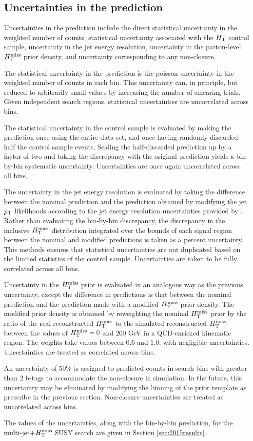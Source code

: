 \subsection{Uncertainties in the prediction}
Uncertainties in the prediction include the direct statistical uncertainty in the weighted number of counts, statistical uncertainty associated with the $H_{\rm T}$ control sample, uncertainty in the jet energy resolution, uncertainty in the parton-level $H_{\text{T}}^{\rm miss}$ prior density, and uncertainty corresponding to any non-closure. 

The statistical uncertainty in the prediction is the poisson uncertainty in the weighted number of counts in each bin. This uncertainty can, in principle, but reduced to arbitrarily small values by increasing the number of smearing trials. Given independent search regions, statistical uncertainties are uncorrelated across bins. 

The statistical uncertainty in the control sample is evaluated by making the prediction once using the entire data set, and once having randomly discarded half the control sample events. Scaling the half-discarded prediction up by a factor of two and taking the discrepancy with the original prediction yields a bin-by-bin systematic uncertainty. Uncertainties are once again uncorrelated across all bins.

The uncertainty in the jet energy resolution is evaluated by taking the difference between the nominal prediction and the prediction obtained by modifying the jet $p_{\text{T}}$ likelihoods according to the jet energy resolution uncertainties provided by  \cite{jetmet2}. Rather than evaluating the bin-by-bin discrepancy, the discrepancy in the inclusive $H_{\text{T}}^{\rm miss}$ distribution integrated over the bounds of each signal region between the nominal and modified predictions is taken as a percent uncertainty. This methods ensures that statistical uncertainties are not duplicated based on the limited statistics of the control sample. Uncertainties are taken to be fully correlated across all bins.

Uncertainty in the $H_{\text{T}}^{\rm miss}$ prior is evaluated in an analogous way as the previous uncertainty, except the difference in predictions is that between the nominal prediction and the prediction made with a modified $H_{\text{T}}^{\rm miss}$ prior density. The modified prior density is obtained by reweighting the nominal $H_{\text{T}}^{\rm miss}$ prior by the ratio of the real reconstructed $H_{\text{T}}^{\rm miss}$ to the simulated reconstructed $H_{\text{T}}^{\rm miss}$ between the values of $H_{\text{T}}^{\rm miss}=0$ and 200 GeV in a QCD-enriched kinematic region. The weights take values between 0.6 and 1.0, with negligible uncertainties. Uncertainties are treated as correlated across bins.

An uncertainty of 50\% is assigned to predicted counts in search bins with greater than 2 b-tags to accommodate the non-closure in simulation. In the future, this uncertainty may be eliminated by modifying the binning of the prior template as prescribe in the previous section. Non-closure uncertainties are treated as uncorrelated across bins. 

The values of the uncertainties, along with the bin-by-bin prediction, for the multi-jet$+$$H_{\text{T}}^{\rm miss}$ SUSY search are given in Section \ref{sec:2015results}.

